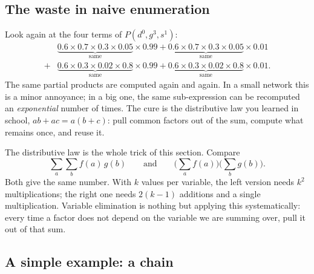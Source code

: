 \documentclass[11pt, oneside]{book}
\let\originalsubsection\subsection
\renewcommand{\subsection}{\Needspace{6\baselineskip}\originalsubsection}
\begin{document}
\subsection{The waste in naive enumeration}

Look again at the four terms of $P(d^0, g^3, s^1)$:
\begin{align*}
&\underbrace{0.6 \times 0.7 \times 0.3 \times 0.05}_{\text{same}} \times 0.99
+ \underbrace{0.6 \times 0.7 \times 0.3 \times 0.05}_{\text{same}} \times 0.01 \\
{}+{} &\underbrace{0.6 \times 0.3 \times 0.02 \times 0.8}_{\text{same}} \times 0.99
+ \underbrace{0.6 \times 0.3 \times 0.02 \times 0.8}_{\text{same}} \times 0.01 .
\end{align*}
The same partial products are computed again and again. In a small network
this is a minor annoyance; in a big one, the same sub-expression can be
recomputed an \emph{exponential} number of times. The cure is the
distributive law you learned in school, $ab + ac = a(b + c)$:
pull common factors out of the sum, compute what remains once, and reuse it.

\begin{intbox}[unbreakable]
The distributive law is the whole trick of this section. Compare
\[
\sum_{a}\sum_{b} f(a)\, g(b)
\qquad\text{and}\qquad
\Big(\sum_{a} f(a)\Big)\Big(\sum_{b} g(b)\Big).
\]
Both give the same number. With $k$ values per variable, the left version
needs $k^2$ multiplications; the right one needs $2(k-1)$ additions and a
single multiplication. Variable elimination is nothing but applying this
systematically: every time a factor does not depend on the variable we are
summing over, pull it out of that sum.
\end{intbox}

\subsection{A simple example: a chain}
\label{sec:ve-chain}
\end{document}
